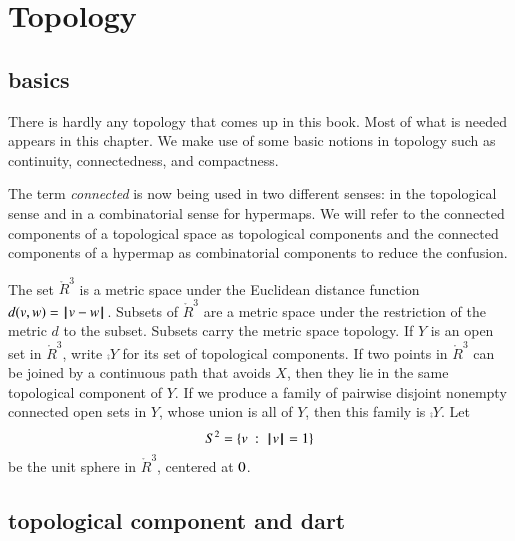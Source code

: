 \section{Topology}\label{sec:topology}

\subsection{basics}

There is hardly any topology that comes up in this book.  Most of
what is needed appears in this chapter.  We make use of some basic
notions in topology such as continuity, connectedness, and compactness.

\begin{remark} The term {\it connected} is now being used in
two different senses: in the topological sense and in a combinatorial
sense for hypermaps.   We will refer to the connected components
of a topological space as topological components and the connected
components of a hypermap as combinatorial components to reduce the confusion.
\end{remark}





The set $\ring{R}^3$ is a metric space under the
Euclidean distance function $d(v,w) = {\hskip0.1em|\hskip-0.15em|\hskip0.1em}v - w{\hskip0.1em|\hskip-0.15em|\hskip0.1em}$.  Subsets of
$\ring{R}^3$ are a metric space under the restriction of the metric
$d$ to the subset. Subsets carry the metric space topology.
If $Y$ is an open set in $\ring{R}^3$, write
$\comp{Y}$ for its set of topological components.
If two
points in $\ring{R}^3$ 
can be joined by a continuous path that avoids $X$,
then they lie in the same topological component of $Y$.
If we produce a family of pairwise disjoint nonempty connected open sets in
$Y$, whose union is all of $Y$, then
this family is $\comp{Y}$.
Let $$S^2 = \{ v \ :\  {{\hskip0.1em|\hskip-0.15em|\hskip0.1em} v{\hskip0.1em|\hskip-0.15em|\hskip0.1em}} = 1\}$$ be the unit sphere in
$\ring{R}^3$, centered at $0$.  






\subsection{topological component and dart}

